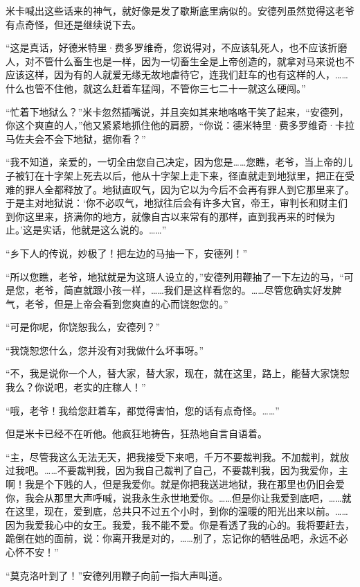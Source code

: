 \par 米卡喊出这些话来的神气，就好像是发了歇斯底里病似的。安德列虽然觉得这老爷有点奇怪，但还是继续说下去。
\par “这是真话，好德米特里·费多罗维奇，您说得对，不应该轧死人，也不应该折磨人，对不管什么畜生也是一样，因为一切畜生全是上帝创造的，就拿对马来说也不应该这样，因为有的人就爱无缘无故地虐待它，连我们赶车的也有这样的人，……什么也管不住他，就这么赶着车猛闯，不管你三七二十一就这么硬闯。”
\par “忙着下地狱么？”米卡忽然插嘴说，并且突如其来地咯咯干笑了起来，“安德列，你这个爽直的人，”他又紧紧地抓住他的肩膀，“你说：德米特里·费多罗维奇·卡拉马佐夫会不会下地狱，据你看？”
\par “我不知道，亲爱的，一切全由您自己决定，因为您是……您瞧，老爷，当上帝的儿子被钉在十字架上死去以后，他从十字架上走下来，径直就走到地狱里，把正在受难的罪人全都释放了。地狱直叹气，因为它以为今后不会再有罪人到它那里来了。于是主对地狱说：‘你不必叹气，地狱往后会有许多大官，帝王，审判长和财主们到你这里来，挤满你的地方，就像自古以来常有的那样，直到我再来的时候为止。’这是实话，他就是这么说的。……”
\par “乡下人的传说，妙极了！把左边的马抽一下，安德列！”
\par “所以您瞧，老爷，地狱就是为这班人设立的，”安德列用鞭抽了一下左边的马，“可是您，老爷，简直就跟小孩一样，……我们是这样看您的。……尽管您确实好发脾气，老爷，但是上帝会看到您爽直的心而饶恕您的。”
\par “可是你呢，你饶恕我么，安德列？”
\par “我饶恕您什么，您并没有对我做什么坏事呀。”
\par “不，我是说你一个人，替大家，替大家，现在，就在这里，路上，能替大家饶恕我么？你说吧，老实的庄稼人！”
\par “哦，老爷！我给您赶着车，都觉得害怕，您的话有点奇怪。……”
\par 但是米卡已经不在听他。他疯狂地祷告，狂热地自言自语着。
\par “主，尽管我这么无法无天，把我接受下来吧，千万不要裁判我。不加裁判，就放过我吧。……不要裁判我，因为我自己裁判了自己，不要裁判我，因为我爱你，主啊！我是个下贱的人，但是我爱你。就是你把我送进地狱，我在那里也仍旧会爱你，我会从那里大声呼喊，说我永生永世地爱你。……但是你让我爱到底吧，……就在这里，现在，爱到底，总共只不过五个小时，到你的温暖的阳光出来以前。……因为我爱我心中的女王。我爱，我不能不爱。你是看透了我的心的。我将要赶去，跪倒在她的面前，说：你离开我是对的，……别了，忘记你的牺牲品吧，永远不必心怀不安！”
\par “莫克洛叶到了！”安德列用鞭子向前一指大声叫道。
